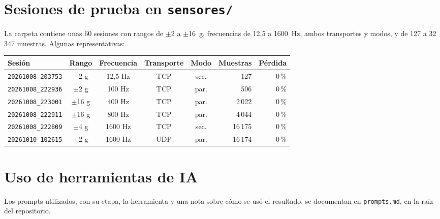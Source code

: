 \documentclass[11pt,a4paper]{report}
\begin{document}
\section{Sesiones de prueba en \texttt{sensores/}}
La carpeta contiene unas 60 sesiones con rangos de $\pm$2 a $\pm$16~g, frecuencias de 12,5 a 1600~Hz, ambos transportes y modos, y de 127 a 32\,347 muestras. Algunas representativas:

\begin{center}\small
\begin{tabular}{@{}l c c c c r r@{}}
\toprule
Sesión & Rango & Frecuencia & Transporte & Modo & Muestras & Pérdida \\ \midrule
\texttt{20261008\_203753} & $\pm$2 g & 12,5 Hz & TCP & sec. & 127 & 0\,\% \\
\texttt{20261008\_222936} & $\pm$2 g & 100 Hz & TCP & par. & 506 & 0\,\% \\
\texttt{20261008\_223001} & $\pm$16 g & 400 Hz & TCP & par. & 2\,022 & 0\,\% \\
\texttt{20261008\_222911} & $\pm$16 g & 800 Hz & TCP & par. & 4\,044 & 0\,\% \\
\texttt{20261008\_222809} & $\pm$4 g & 1600 Hz & TCP & sec. & 16\,175 & 0\,\% \\
\texttt{20261010\_102615} & $\pm$2 g & 1600 Hz & UDP & par. & 16\,174 & 0\,\% \\ \bottomrule
\end{tabular}
\end{center}

\section{Uso de herramientas de IA}
Los prompts utilizados, con su etapa, la herramienta y una nota sobre cómo se usó el resultado, se documentan en \texttt{prompts.md}, en la raíz del repositorio.
\end{document}
